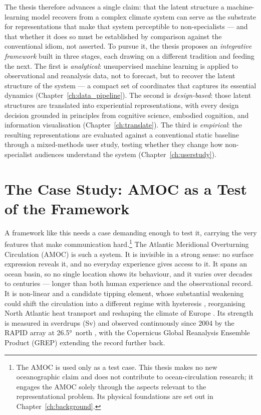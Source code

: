 The thesis therefore advances a single claim: that the latent structure a machine-learning model recovers from a complex climate system can serve as the substrate for representations that make that system perceptible to non-specialists --- and that whether it does so must be established by comparison against the conventional idiom, not asserted. To pursue it, the thesis proposes an \emph{integrative framework} built in three stages, each drawing on a different tradition and feeding the next. The first is \emph{analytical}: unsupervised machine learning is applied to observational and reanalysis data, not to forecast, but to recover the latent structure of the system --- a compact set of coordinates that captures its essential dynamics (Chapter~\ref{ch:data_pipeline}). The second is \emph{design-based}: those latent structures are translated into experiential representations, with every design decision grounded in principles from cognitive science, embodied cognition, and information visualisation (Chapter~\ref{ch:translate}). The third is \emph{empirical}: the resulting representations are evaluated against a conventional static baseline through a mixed-methods user study, testing whether they change how non-specialist audiences understand the system (Chapter~\ref{ch:userstudy}).
\section{The Case Study: AMOC as a Test of the Framework}
\label{sec:case-study-amoc}

A framework like this needs a case demanding enough to test it, carrying the very features that make communication hard.\footnote{The AMOC is used only as a test case. This thesis makes no new oceanographic claim and does not contribute to ocean-circulation research; it engages the AMOC solely through the aspects relevant to the representational problem. Its physical foundations are set out in Chapter~\ref{ch:background}.} The Atlantic Meridional Overturning Circulation (AMOC) is such a system. It is invisible in a strong sense: no surface expression reveals it, and no everyday experience gives access to it. It spans an ocean basin, so no single location shows its behaviour, and it varies over decades to centuries --- longer than both human experience and the observational record. It is non-linear and a candidate tipping element, whose substantial weakening could shift the circulation into a different regime with hysteresis \citep{armstrongmckay2022, lenton2008}, reorganising North Atlantic heat transport and reshaping the climate of Europe \citep{buckley2016}. Its strength is measured in sverdrups (Sv) and observed continuously since 2004 by the RAPID array at \ang{26.5}~north \citep{frajkawilliams2021, moat2026}, with the Copernicus Global Reanalysis Ensemble Product (GREP) extending the record further back.
 
